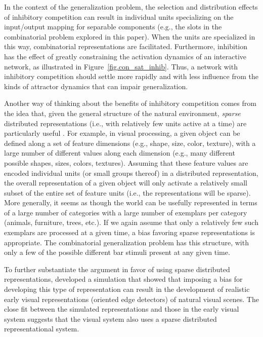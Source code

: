 \documentclass[12pt,twoside]{article}
\begin{document}
In the context of the generalization problem, the selection and
distribution effects of inhibitory competition can result in
individual units specializing on the input/output mapping for
separable components (e.g., the slots in the combinatorial problem
explored in this paper).  When the units are specialized in this way,
combinatorial representations are facilitated.  Furthermore,
inhibition has the effect of greatly constraining the activation
dynamics of an interactive network, as illustrated in
Figure~\ref{fig.con_sat_inhib}.  Thus, a network with inhibitory
competition should settle more rapidly and with less influence from
the kinds of attractor dynamics that can impair generalization.

Another way of thinking about the benefits of inhibitory competition
comes from the idea that, given the general structure of the natural
environment, {\em sparse} distributed representations (i.e., with
relatively few units active at a time) are particularly useful
\cite{Barlow89,Field94}.  For example, in visual processing, a given
object can be defined along a set of feature dimensions (e.g., shape,
size, color, texture), with a large number of different values along
each dimension (e.g., many different possible shapes, sizes, colors,
textures).  Assuming that these feature values are encoded individual
units (or small groups thereof) in a distributed representation, the
overall representation of a given object will only activate a
relatively small subset of the entire set of feature units (i.e., the
representations will be sparse).  More generally, it seems as though
the world can be usefully represented in terms of a large number of
categories with a large number of exemplars per category (animals,
furniture, trees, etc.).  If we again assume that only a relatively
few such exemplars are processed at a given time, a bias favoring
sparse representations is appropriate.  The combinatorial
generalization problem has this structure, with only a few of the
possible different bar stimuli present at any given time.

To further substantiate the argument in favor of using sparse
distributed representations,  developed a
simulation that showed that imposing a bias for developing this type
of representation can result in the development of realistic early
visual representations (oriented edge detectors) of natural visual
scenes.  The close fit between the simulated representations and those
in the early visual system suggests that the visual system also uses a
sparse distributed representational system.
\end{document}
